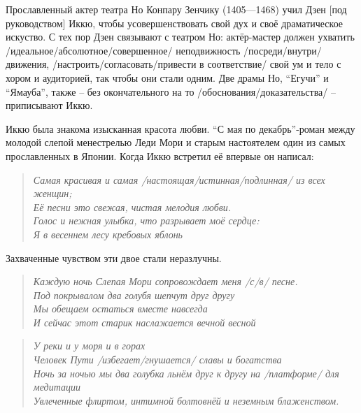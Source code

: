 \begin{ver}
Прославленный актер театра Но Конпару Зенчику (1405---1468) учил
Дзен [под руководством] Иккю, чтобы усовершенствовать свой
дух и своё драматическое искуство. С тех пор Дзен связывают
с театром Но: актёр-мастер должен ухватить
/идеальное/абсолютное/совершенное/ неподвижность /посреди/внутри/
движения, /настроить/согласовать/привести в соответствие/ свой ум и
тело с хором и аудиторией, так чтобы они стали одним. Две драмы Но,
``Егучи'' и ``Ямауба'', также  -- без окончательного на то
/обоснования/доказательства/ -- приписывают Иккю.   
\end{ver}

\begin{ver}
  Иккю была знакома изысканная красота любви. ``С мая по
  декабрь''-роман между молодой слепой менестрелью Леди Мори и старым
  настоятелем один из самых прославленных в Японии. Когда Иккю
  встретил её впервые он написал:
\end{ver}

\begin{ver}
  \begin{verse}\it
    Самая красивая и самая /настоящая/истинная/подлинная/
    из всех женщин;\\
    Её песни это свежая, чистая мелодия любви.\\
    Голос и нежная улыбка, что разрывает моё сердце:\\
    Я в весеннем лесу кребовых яблонь
  \end{verse}
\end{ver}

\begin{ver}
  Захваченные чувством эти двое стали неразлучны.
\end{ver}


\begin{ver}
  \begin{verse}\it
    Каждую ночь Слепая Мори сопровождает меня /с/в/ песне.\\
    Под покрывалом два голубя шепчут друг другу\\
    Мы обещаем остаться вместе навсегда\\
    И сейчас этот старик наслажается вечной весной
  \end{verse}
\end{ver}


\begin{ver}
  \begin{verse}\it
    У реки и у моря и в горах\\
    Человек Пути /избегает/гнушается/ славы и богатства\\
    Ночь за ночью мы два голубка льнём друг к другу на
    /платформе/ для медитации\\
    Увлеченные флиртом, интимной болтовнёй и
    неземным блаженством.
  \end{verse}
\end{ver}

